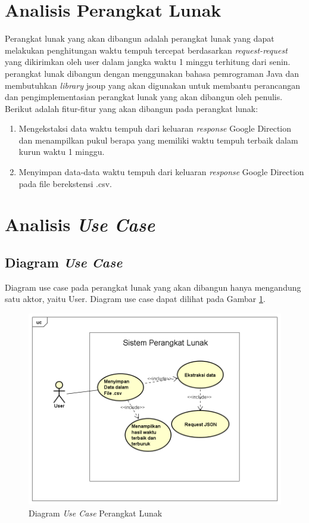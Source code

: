 \section{Analisis Perangkat Lunak}
\label{sec:analisispl}

Perangkat lunak yang akan dibangun adalah perangkat lunak yang dapat melakukan penghitungan waktu tempuh tercepat berdasarkan \textit{request-request} yang dikirimkan oleh user dalam jangka waktu 1 minggu terhitung dari senin. perangkat lunak dibangun dengan menggunakan bahasa pemrograman Java dan membutuhkan \textit{library} jsoup yang akan digunakan untuk membantu perancangan dan pengimplementasian perangkat lunak yang akan dibangun oleh penulis. Berikut adalah fitur-fitur yang akan dibangun pada perangkat lunak:

\begin{enumerate}
	\item Mengekstaksi data waktu tempuh dari keluaran \textit{response} Google Direction dan menampilkan pukul berapa yang memiliki waktu tempuh terbaik dalam kurun waktu 1 minggu.
	\item Menyimpan data-data waktu tempuh dari keluaran \textit{response} Google Direction pada file berekstensi .csv.
\end{enumerate}
 
\section{Analisis \textit{Use Case}}
\label{sec:analisisusecase}

\subsection{Diagram \textit{Use Case}}
\label{subsec:diagramusecase}

Diagram use case pada perangkat lunak yang akan dibangun hanya mengandung satu aktor, yaitu User. Diagram use case dapat dilihat pada Gambar \ref{fig:diagramusecase}.

\begin{figure}[H]
				\centering		
				\includegraphics[scale=0.45]{Gambar/UseCaseDiagram.png}
				\caption[Diagram \textit{Use Case} Perangkat Lunak]{Diagram \textit{Use Case} Perangkat Lunak}
				\label{fig:diagramusecase}	
\end{figure}
			
